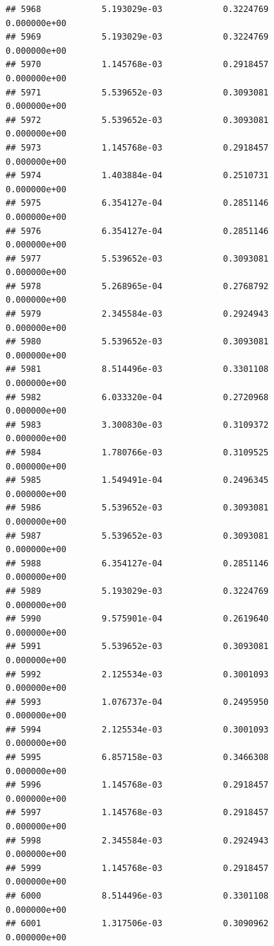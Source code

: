\documentclass[
]{article}
\begin{document}
\begin{verbatim}
## 5968            5.193029e-03            0.3224769            0.000000e+00
## 5969            5.193029e-03            0.3224769            0.000000e+00
## 5970            1.145768e-03            0.2918457            0.000000e+00
## 5971            5.539652e-03            0.3093081            0.000000e+00
## 5972            5.539652e-03            0.3093081            0.000000e+00
## 5973            1.145768e-03            0.2918457            0.000000e+00
## 5974            1.403884e-04            0.2510731            0.000000e+00
## 5975            6.354127e-04            0.2851146            0.000000e+00
## 5976            6.354127e-04            0.2851146            0.000000e+00
## 5977            5.539652e-03            0.3093081            0.000000e+00
## 5978            5.268965e-04            0.2768792            0.000000e+00
## 5979            2.345584e-03            0.2924943            0.000000e+00
## 5980            5.539652e-03            0.3093081            0.000000e+00
## 5981            8.514496e-03            0.3301108            0.000000e+00
## 5982            6.033320e-04            0.2720968            0.000000e+00
## 5983            3.300830e-03            0.3109372            0.000000e+00
## 5984            1.780766e-03            0.3109525            0.000000e+00
## 5985            1.549491e-04            0.2496345            0.000000e+00
## 5986            5.539652e-03            0.3093081            0.000000e+00
## 5987            5.539652e-03            0.3093081            0.000000e+00
## 5988            6.354127e-04            0.2851146            0.000000e+00
## 5989            5.193029e-03            0.3224769            0.000000e+00
## 5990            9.575901e-04            0.2619640            0.000000e+00
## 5991            5.539652e-03            0.3093081            0.000000e+00
## 5992            2.125534e-03            0.3001093            0.000000e+00
## 5993            1.076737e-04            0.2495950            0.000000e+00
## 5994            2.125534e-03            0.3001093            0.000000e+00
## 5995            6.857158e-03            0.3466308            0.000000e+00
## 5996            1.145768e-03            0.2918457            0.000000e+00
## 5997            1.145768e-03            0.2918457            0.000000e+00
## 5998            2.345584e-03            0.2924943            0.000000e+00
## 5999            1.145768e-03            0.2918457            0.000000e+00
## 6000            8.514496e-03            0.3301108            0.000000e+00
## 6001            1.317506e-03            0.3090962            0.000000e+00

\end{verbatim}
\end{document}
